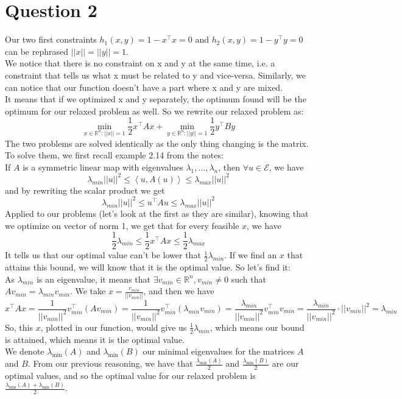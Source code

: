 \documentclass{article}
\newcommand{\R}{\mathbb{R}}
\begin{document}
\section*{Question 2}

Our two first constraints $h_1(x,y)=1-x^\top x =0$ and $h_2(x,y)=1-y^\top y =0$ can be rephrased $||x||=||y||=1$.\\
We notice that there is no constraint on x and y at the same time, i.e. a constraint that tells us what x must be related to y and vice-versa. Similarly, we can notice that our function doesn't have a part where x and y are mixed.\\
It means that if we optimized x and y separately, the optimum found will be the optimum for our relaxed problem as well. So we rewrite our relaxed problem as:
$$\min_{x\in \R^n:||x||=1}  \frac{1}{2} x^\top A x +\min_{y \in \R^n:||y||=1} \frac{1}{2} y^\top B y$$
The two problems are solved identically as the only thing changing is the matrix. To solve them, we first recall example 2.14 from the notes:\\
If $A$ is a symmetric linear map with eigenvalues $\lambda_1, ...,\lambda_n$, then $\forall u \in \mathcal{E}$, we have $$\lambda_{min} ||u||^2 \leq \left< u, A(u)\right>\leq \lambda_{max}||u||^2$$
and by rewriting the scalar product we get 
$$\lambda_{min} ||u||^2 \leq u^\top A u \leq \lambda_{max} ||u||^2$$
Applied to our problems (let's look at the first as they are similar), knowing that we optimize on vector of norm 1, we get that for every feasible $x$, we have
$$\frac{1}{2}\lambda_{min}  \leq\frac{1}{2} x^\top A x \leq\frac{1}{2} \lambda_{max} $$
It tells us that our optimal value can't be lower that $\frac{1}{2} \lambda_{min}$. If we find an $x$ that attains this bound, we will know that it is the optimal value. So let's find it:\\
As $\lambda_{min}$ is an eigenvalue, it means that $\exists v_{min} \in \R^n, v_{min} \neq 0$ such that $A v_{min}=\lambda_{min} v_{min}$. We take $x=\frac{v_{min}}{||v_{min}||}$, and then we have
$$x^\top A x =\frac{1}{||v_{min}||^2} v_{min}^\top \left( A v_{min} \right)=\frac{1}{||v_{min}||^2} v_{min}^\top (\lambda_{min} v_{min})=\frac{\lambda_{min}}{||v_{min}||^2} v_{min}^\top v_{min}=\frac{\lambda_{min}}{||v_{min}||^2} \cdot ||v_{min}||^2=\lambda_{min}$$
So, this $x$, plotted in our function, would give us $\frac{1}{2}\lambda_{min} $, which means our bound is attained, which means it is the optimal value. \\
We denote $\lambda_{\min} (A)$ and $\lambda_{\min} (B)$ our minimal eigenvalues for the matrices $A$ and $B$. From our previous reasoning, we have that $\frac{\lambda_{\min} (A)}{2}$ and $\frac{\lambda_{\min} (B)}{2}$ are our optimal values, and so the optimal value for our relaxed problem is $\frac{\lambda_{\min} (A)+\lambda_{\min} (B)}{2}$.
\end{document}
